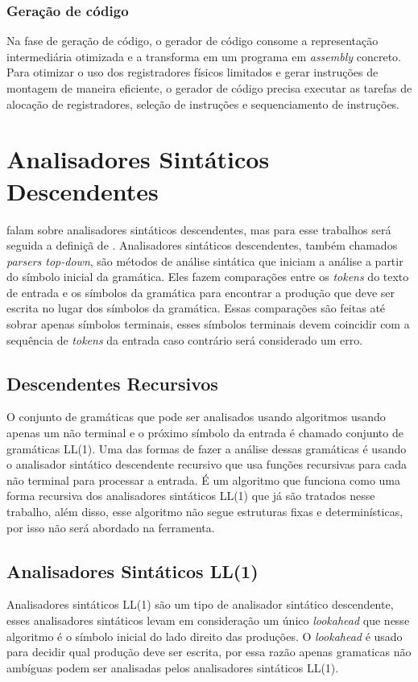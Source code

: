 \subsubsection{Geração de código}
Na fase de geração de código, o gerador de código consome a representação intermediária otimizada e a transforma em um programa em \textit{assembly} concreto. Para otimizar o uso dos registradores físicos limitados e gerar instruções de montagem de maneira eficiente, o gerador de código precisa executar as tarefas de alocação de registradores, seleção de instruções e sequenciamento de instruções.

\section{Analisadores Sintáticos Descendentes}
\textcite{cooper2022engineering,mogensen2024introduction, thain2020introduction} falam sobre analisadores sintáticos descendentes, mas para esse trabalhos será seguida a definiçã de \textcite{thain2020introduction}. Analisadores sintáticos descendentes, também chamados \textit{parsers top-down}, são métodos de análise sintática que iniciam a análise a partir do símbolo inicial da gramática. Eles fazem comparações entre os \textit{tokens} do texto de entrada e os símbolos da gramática para encontrar a produção que deve ser escrita no lugar dos símbolos da gramática. Essas comparações são feitas até sobrar apenas símbolos terminais, esses símbolos terminais devem coincidir com a sequência de \textit{tokens} da entrada caso contrário será considerado um erro.

\subsection{Descendentes Recursivos}
O conjunto de gramáticas que pode ser analisados usando algoritmos usando apenas um não terminal e o próximo símbolo da entrada é chamado conjunto de gramáticas LL(1). Uma das formas de fazer a análise dessas gramáticas é usando o analisador sintático descendente recursivo que usa funções recursivas para cada não terminal para processar a entrada. É um algoritmo que funciona como uma forma recursiva dos analisadores sintáticos LL(1) que já são tratados nesse trabalho, além disso, esse algoritmo não segue estruturas fixas e determinísticas, por isso não será abordado na ferramenta.

\subsection{Analisadores Sintáticos LL(1)}
Analisadores sintáticos LL(1) são um tipo de analisador sintático descendente, esses analisadores sintáticos levam em consideração um único \textit{lookahead} que nesse algoritmo é o símbolo inicial do lado direito das produções. O \textit{lookahead} é usado para decidir qual produção deve ser escrita, por essa razão apenas gramaticas não ambíguas podem ser analisadas pelos analisadores sintáticos LL(1).

